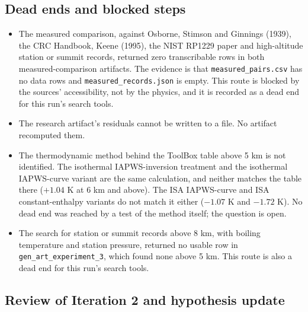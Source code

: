 \documentclass[11pt,letterpaper]{article}
\begin{document}
\subsection{Dead ends and blocked steps}

\begin{itemize}
\item The measured comparison, against Osborne, Stimson and Ginnings (1939), the CRC Handbook, Keene (1995), the NIST RP1229 paper and high-altitude station or summit records, returned zero transcribable rows in both measured-comparison artifacts. The evidence is that \texttt{measured\_pairs.csv} has no data rows and \texttt{measured\_records.json} is empty. This route is blocked by the sources' accessibility, not by the physics, and it is recorded as a dead end for this run's search tools.
\item The research artifact's residuals cannot be written to a file. No artifact recomputed them.
\item The thermodynamic method behind the ToolBox table above 5 km is not identified. The isothermal IAPWS-inversion treatment and the isothermal IAPWS-curve variant are the same calculation, and neither matches the table there ($+1.04$ K at 6 km and above). The ISA IAPWS-curve and ISA constant-enthalpy variants do not match it either ($-1.07$ K and $-1.72$ K). No dead end was reached by a test of the method itself; the question is open.
\item The search for station or summit records above 8 km, with boiling temperature and station pressure, returned no usable row in \texttt{gen\_art\_experiment\_3}, which found none above 5 km. This route is also a dead end for this run's search tools.
\end{itemize}

\subsection{Review of Iteration 2 and hypothesis update}
\end{document}
